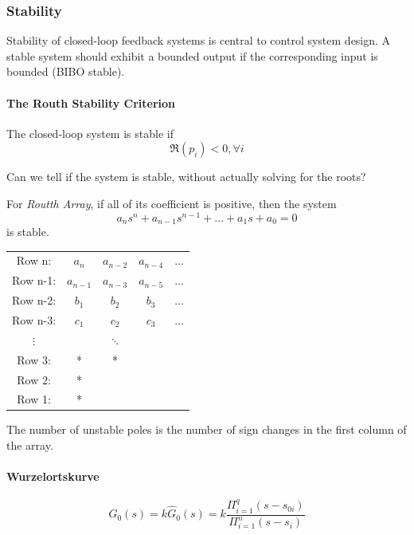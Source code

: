 \subsubsection{Stability}
Stability of closed-loop feedback systems is central to control system design. A stable system should exhibit a bounded output if the corresponding input is bounded (BIBO stable).

\paragraph{The Routh Stability Criterion} The closed-loop system is stable if $$\Re(p_i)<0, \forall i$$

Can we tell if the system is stable, without actually solving for the roots?

For \emph{Routth Array}, if all of its coefficient is positive, then the system$$a_ns^n+a_{n-1}s^{n-1}+\dots+a_1s+a_0=0$$is stable.


\begin{tabular}{ccccc}
  Row n: & $a_n$ & $a_{n-2}$ & $a_{n-4}$ & $\dots$ \\
  Row n-1: & $a_{n-1}$ & $a_{n-3}$ & $a_{n-5}$ & $\dots$ \\
  Row n-2: & $b_1$ & $b_2$ & $b_3$ & $\dots$ \\
  Row n-3: & $c_1$ & $c_2$ & $c_3$ & $\dots$ \\
  $\vdots$ &   & $\ddots$ &   &   \\
  Row 3: & * & * &  &\\
  Row 2: & * &   &   &   \\
  Row 1: & * &   &   &   \\
\end{tabular}

The number of unstable poles is the number of sign changes in the first column of the array.

\paragraph{Wurzelortskurve}

$$G_0(s) = k \hat{G}_0(s) = k \frac{\Pi_{i=1}^{q}(s-s_{0i})}{\Pi_{i=1}^{n}(s-s_i)}$$

